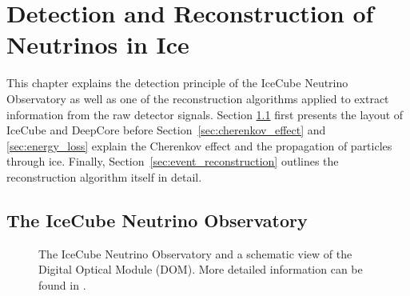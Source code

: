 \chapter{Detection and Reconstruction of Neutrinos in Ice} \label{chap:neutrino_detection}

This chapter explains the detection principle of the IceCube Neutrino Observatory as well as one of the reconstruction algorithms applied to extract information from the raw detector signals.
Section \ref{sec:icecube_deepcore} first presents the layout of IceCube and DeepCore before Section~\ref{sec:cherenkov_effect} and \ref{sec:energy_loss} explain the Cherenkov effect and the propagation of particles through ice.
Finally, Section~\ref{sec:event_reconstruction} outlines the reconstruction algorithm itself in detail.


\section{The IceCube Neutrino Observatory} \label{sec:icecube_deepcore}

\begin{figure}[ht]
	\centering
	\caption[IceCube Neutrino Observatory and Digital Optical Module]{The IceCube Neutrino Observatory and a schematic view of the Digital Optical Module (DOM). More detailed information can be found in \cite{2017JInst..12P3012A_Instrumentation_Systems}.}
\end{figure}

